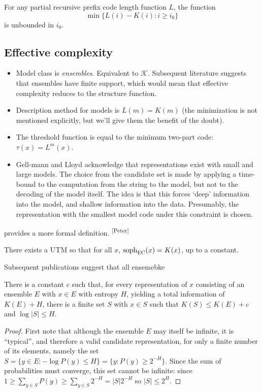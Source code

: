 \documentclass{style/llncs}
\newcommand{\K}{\mathscr K}
\newcommand{\tn}[1]{\textnormal{#1}}
\newcommand{\s}{\tn{soph}}
\newcommand{\pb}[1]{\textcolor{OliveGreen}{\small #1 \textsuperscript{[Peter]} }}
\begin{document}
\begin{conjecture}
For any partial recursive prefix code length function $L$, the function
\[
\min\{L(i)-K(i):i\ge i_0\}
\]
is unbounded in $i_0$.
\end{conjecture}

\subsection{Effective complexity}

\begin{itemize}
\item Model class is \emph{ensembles}. Equivalent to $\K$. Subsequent literature suggests that ensembles have finite support, which would mean that effective complexity reduces to the structure function.
\item Description method for models is $L(m) = K(m)$ (the minimization is not mentioned explicitly, but we'll give them the benefit of the doubt).
\item The threshold function is equal to the minimum two-part code: $\tau(x)=L^m(x)$.
\item Gell-mann and Lloyd acknowledge that representations exist with small and large models. The choice from the candidate set is made by applying a time-bound to the computation from the string to the model, but not to the decoding of the model itself. The idea is that this forces `deep' information into the model, and shallow information into the data. Presumably, the representation with the smallest model code under this constraint is chosen.   
\end{itemize} 

\pb{\cite{ay2010effective} provides a more formal definition.}
\begin{theorem}
There exists a UTM so that for all $x$, $\s_\text{EC}(x) = K(x)$, up to a constant. 
\end{theorem}

Subsequent publications suggest that all ensemebke  

\begin{theorem}
  There is a constant $c$ such that, for every representation of $x$
  consisting of an ensemble $E$ with $x\in E$ with entropy $H$,
  yielding a total information of $K(E)+H$, there is a finite set $S$
  with $x\in S$ such that $K(S)\le K(E)+c$ and $\log|S|\le H$.
\end{theorem}
\begin{proof}
  First note that although the ensemble $E$ may itself be infinite, it
  is ``typical'', and therefore a valid candidate representation, for
  only a finite number of its elements, namely the set $S=\{y\in E:-\log
  P(y)\le H\} = \{y:P(y)\ge 2^{-H}\}$. Since the sum of probabilities must
  converge, this set cannot be infinite: since $1\ge\sum_{y\in S} P(y)\ge
  \sum_{y\in S}2^{-H} = |S|2^{-H}$ so $|S|\le 2^H$.


\end{proof}
\end{document}
